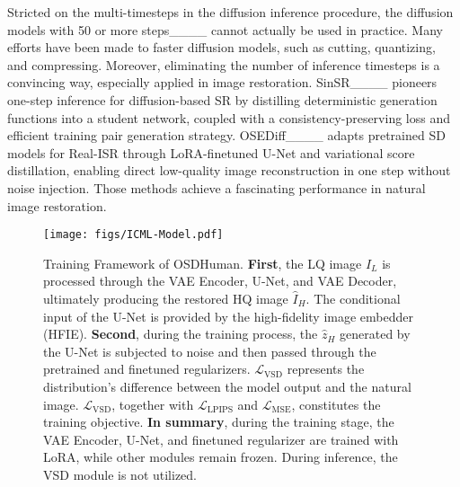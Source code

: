 Stricted on the multi-timesteps in the diffusion inference procedure, the diffusion models with 50 or more steps____ cannot actually be used in practice. Many efforts have been made to faster diffusion models, such as cutting, quantizing, and compressing. Moreover, eliminating the number of inference timesteps is a convincing way, especially applied in image restoration. SinSR____ pioneers one-step inference for diffusion-based SR by distilling deterministic generation functions into a student network, coupled with a consistency-preserving loss and efficient training pair generation strategy. OSEDiff____ adapts pretrained SD models for Real-ISR through LoRA-finetuned U-Net and variational score distillation, enabling direct low-quality image reconstruction in one step without noise injection. Those methods achieve a fascinating performance in natural image restoration. 

\begin{figure*}[t]
\begin{center}

\texttt{[image: figs/ICML-Model.pdf]}

\end{center}
\vspace{-5mm}
\caption{Training Framework of OSDHuman. \textbf{First}, the LQ image $I_L$ is processed through the VAE Encoder, U-Net, and VAE Decoder, ultimately producing the restored HQ image $\hat{I}_H$. The conditional input of the U-Net is provided by the high-fidelity image embedder (HFIE). \textbf{Second}, during the training process, the $\hat{z}_H$ generated by the U-Net is subjected to noise and then passed through the pretrained and finetuned regularizers. $\mathcal{L}_{\text{VSD}}$ represents the distribution's difference between the model output and the natural image. $\mathcal{L}_{\text{VSD}}$, together with $\mathcal{L}_{\text{LPIPS}}$ and $\mathcal{L}_{\text{MSE}}$, constitutes the training objective. \textbf{In summary}, during the training stage, the VAE Encoder, U-Net, and finetuned regularizer are trained with LoRA, while other modules remain frozen. During inference, the VSD module is not utilized.
}

\vspace{-5mm}
\label{fig:model_architecture}
\end{figure*}

\vspace{-2mm}
